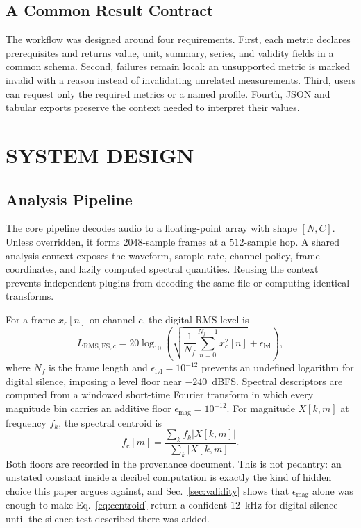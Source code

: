 \documentclass[final]{jaes}
\begin{document}
\subsection{A Common Result Contract}

The workflow was designed around four requirements. First, each metric declares prerequisites and returns value, unit, summary, series, and validity fields in a common schema. Second, failures remain local: an unsupported metric is marked invalid with a reason instead of invalidating unrelated measurements. Third, users can request only the required metrics or a named profile. Fourth, JSON and tabular exports preserve the context needed to interpret their values.

\section{SYSTEM DESIGN}

\subsection{Analysis Pipeline}

The core pipeline decodes audio to a floating-point array with shape $[N,C]$. Unless overridden, it forms $2048$-sample frames at a $512$-sample hop. A shared analysis context exposes the waveform, sample rate, channel policy, frame coordinates, and lazily computed spectral quantities. Reusing the context prevents independent plugins from decoding the same file or computing identical transforms.

For a frame $x_c[n]$ on channel $c$, the digital RMS level is
\begin{equation}
L_{\mathrm{RMS,FS},c}=20\log_{10}\left(
\sqrt{\frac{1}{N_f}\sum_{n=0}^{N_f-1}x_c^2[n]}+\epsilon_{\mathrm{lvl}}\right),
\label{eq:rms}
\end{equation}
where $N_f$ is the frame length and $\epsilon_{\mathrm{lvl}}=10^{-12}$ prevents an undefined logarithm for digital silence, imposing a level floor near $-240$~dBFS. Spectral descriptors are computed from a windowed short-time Fourier transform in which every magnitude bin carries an additive floor $\epsilon_{\mathrm{mag}}=10^{-12}$. For magnitude $X[k,m]$ at frequency $f_k$, the spectral centroid is
\begin{equation}
f_{\mathrm{c}}[m]=\frac{\sum_k f_k |X[k,m]|}{\sum_k |X[k,m]|}.
\label{eq:centroid}
\end{equation}
Both floors are recorded in the provenance document. This is not pedantry: an unstated constant inside a decibel computation is exactly the kind of hidden choice this paper argues against, and Sec.~\ref{sec:validity} shows that $\epsilon_{\mathrm{mag}}$ alone was enough to make Eq.~\eqref{eq:centroid} return a confident $12$~kHz for digital silence until the silence test described there was added.
\end{document}
